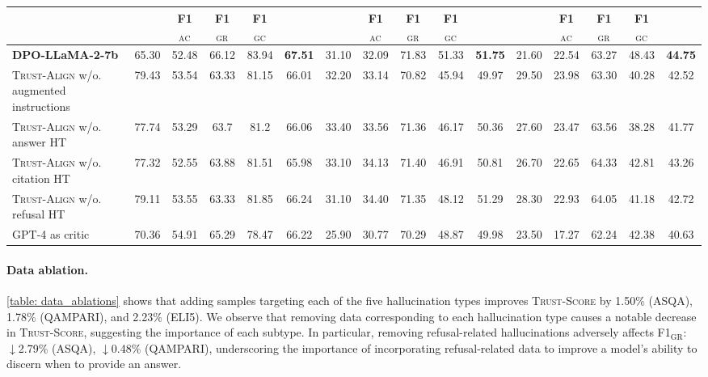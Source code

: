 \documentclass{article} %
\newcommand{\method}[0]{\textsc{Trust-Align}}
\newcommand{\metric}[0]{\textsc{Trust-Score}}
\begin{document}
\begin{table}[htb!]
{\begin{tabular}{l*{15}{c}}
\textbf{} & \textbf{} & \textbf{F1$_{\text{AC}}$} & \textbf{F1$_{\text{GR}}$} & \textbf{F1$_{\text{GC}}$} & \textbf{} & & \textbf{F1$_{\text{AC}}$} & \textbf{F1$_{\text{GR}}$} & \textbf{F1$_{\text{GC}}$} & \textbf{} & & \textbf{F1$_{\text{AC}}$} & \textbf{F1$_{\text{GR}}$} & \textbf{F1$_{\text{GC}}$} & \textbf{} \\
\midrule
\textbf{DPO-LLaMA-2-7b} & 65.30 & 52.48 & 66.12 & 83.94 & \bf 67.51 & 31.10 & 32.09 & 71.83 & 51.33 & \bf 51.75 & 21.60 & 22.54 & 63.27 & 48.43 & \bf 44.75 \\
\midrule
\method{} w/o. augmented instructions & 79.43 & 53.54 & 63.33 & 81.15 & 66.01 & 32.20 & 33.14 & 70.82 & 45.94 & 49.97 & 29.50 & 23.98 & 63.30 & 40.28 & 42.52 \\
\method{} w/o. answer HT & 77.74 & 53.29 & 63.7 & 81.2 & 66.06 & 33.40 & 33.56 & 71.36 & 46.17 & 50.36 & 27.60 & 23.47 & 63.56 & 38.28 & 41.77\\
\method{} w/o. citation HT & 77.32 & 52.55 & 63.88 & 81.51 & 65.98 & 33.10 & 34.13 & 71.40 & 46.91 & 50.81 & 26.70 & 22.65 & 64.33 & 42.81 & 43.26 \\
\method{} w/o. refusal HT & 79.11	& 53.55 & 63.33 & 81.85 & 66.24 & 31.10 & 34.40 & 71.35 & 48.12 & 51.29 & 28.30 & 22.93 & 64.05 & 41.18 & 42.72 \\
GPT-4 as critic & 70.36 & 54.91 & 65.29 & 78.47 & 66.22 & 25.90 & 30.77 & 70.29 & 48.87 & 49.98 & 23.50 &	17.27 & 62.24 & 42.38 & 40.63 \\
\bottomrule
\end{tabular}
}

\end{table}
\paragraph{Data ablation.} \label{sec: Different choices of data synthesis techniques}
\cref{table: data_ablations} shows that adding samples targeting each of the five hallucination types improves \metric{} by 1.50\% (ASQA), 1.78\% (QAMPARI), and 2.23\% (ELI5). We observe that removing data corresponding to each hallucination type causes a notable decrease in \metric{}, suggesting the importance of each subtype. In particular, removing refusal-related hallucinations adversely affects {F1$_{\text{GR}}$}: $\downarrow$2.79\% (ASQA), $\downarrow$0.48\% (QAMPARI), underscoring the importance of incorporating refusal-related data to improve a model's ability to discern when to provide an answer. 
\end{document}
